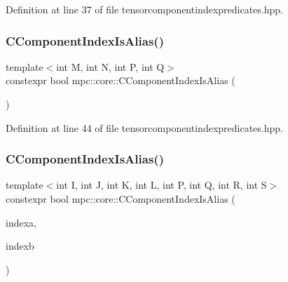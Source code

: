 Definition at line 37 of file tensorcomponentindexpredicates.\+hpp.

\mbox{\label{namespacempc_1_1core_a27928f5f83ac3728a04d378fca923dbf}} 
\subsubsection{\texorpdfstring{C\+Component\+Index\+Is\+Alias()}{CComponentIndexIsAlias()}\hspace{0.1cm}{\footnotesize\ttfamily [2/4]}}
{\footnotesize\ttfamily template$<$int M, int N, int P, int Q$>$ \\
constexpr bool mpc\+::core\+::\+C\+Component\+Index\+Is\+Alias (\begin{DoxyParamCaption}{ }\end{DoxyParamCaption})\hspace{0.3cm}{\ttfamily [inline]}}



Definition at line 44 of file tensorcomponentindexpredicates.\+hpp.

\mbox{\label{namespacempc_1_1core_a460c912b41c051dee4402f90e271577b}} 
\subsubsection{\texorpdfstring{C\+Component\+Index\+Is\+Alias()}{CComponentIndexIsAlias()}\hspace{0.1cm}{\footnotesize\ttfamily [3/4]}}
{\footnotesize\ttfamily template$<$int I, int J, int K, int L, int P, int Q, int R, int S$>$ \\
constexpr bool mpc\+::core\+::\+C\+Component\+Index\+Is\+Alias (\begin{DoxyParamCaption}\item[{const \mbox{\hyperlink{classmpc_1_1core_1_1_c_tensor_rank4_component_index}{mpc\+::core\+::\+C\+Tensor\+Rank4\+Component\+Index}}$<$ I, J, K, L $>$ \&}]{indexa,  }\item[{const \mbox{\hyperlink{classmpc_1_1core_1_1_c_tensor_rank4_component_index}{mpc\+::core\+::\+C\+Tensor\+Rank4\+Component\+Index}}$<$ P, Q, R, S $>$ \&}]{indexb }\end{DoxyParamCaption})\hspace{0.3cm}{\ttfamily [inline]}}



